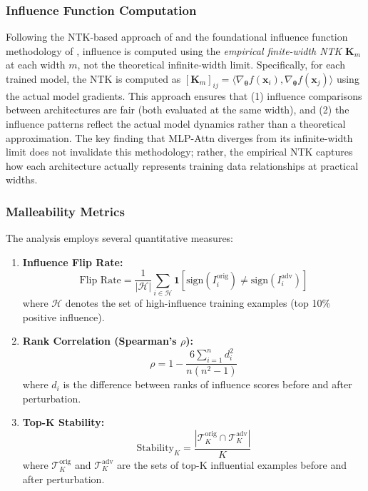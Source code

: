 \documentclass{article}
\theoremstyle{plain}
\theoremstyle{definition}
\theoremstyle{remark}
\begin{document}
\subsubsection{Influence Function Computation}
Following the NTK-based approach of \citet{zhang2022rethinking} and the foundational influence function methodology of \citet{koh2017understanding}, influence is computed using the \emph{empirical finite-width NTK} $\mathbf{K}_m$ at each width $m$, not the theoretical infinite-width limit. Specifically, for each trained model, the NTK is computed as $[\mathbf{K}_m]_{ij} = \langle \nabla_{\boldsymbol{\theta}} f(\mathbf{x}_i), \nabla_{\boldsymbol{\theta}} f(\mathbf{x}_j) \rangle$ using the actual model gradients. This approach ensures that (1) influence comparisons between architectures are fair (both evaluated at the same width), and (2) the influence patterns reflect the actual model dynamics rather than a theoretical approximation. The key finding that MLP-Attn diverges from its infinite-width limit does not invalidate this methodology; rather, the empirical NTK captures how each architecture actually represents training data relationships at practical widths.

\subsubsection{Malleability Metrics}
The analysis employs several quantitative measures:

\begin{enumerate}
\item \textbf{Influence Flip Rate:}
$$\text{Flip Rate} = \frac{1}{|\mathcal{H}|} \sum_{i \in \mathcal{H}} \mathbf{1}[\text{sign}(I_i^{\text{orig}}) \neq \text{sign}(I_i^{\text{adv}})]$$
where $\mathcal{H}$ denotes the set of high-influence training examples (top 10\% positive influence).

\item \textbf{Rank Correlation (Spearman's $\rho$):}
$$\rho = 1 - \frac{6 \sum_{i=1}^n d_i^2}{n(n^2 - 1)}$$
where $d_i$ is the difference between ranks of influence scores before and after perturbation.

\item \textbf{Top-K Stability:}
$$\text{Stability}_K = \frac{|\mathcal{T}_K^{\text{orig}} \cap \mathcal{T}_K^{\text{adv}}|}{K}$$
where $\mathcal{T}_K^{\text{orig}}$ and $\mathcal{T}_K^{\text{adv}}$ are the sets of top-K influential examples before and after perturbation.
\end{enumerate}
\end{document}
